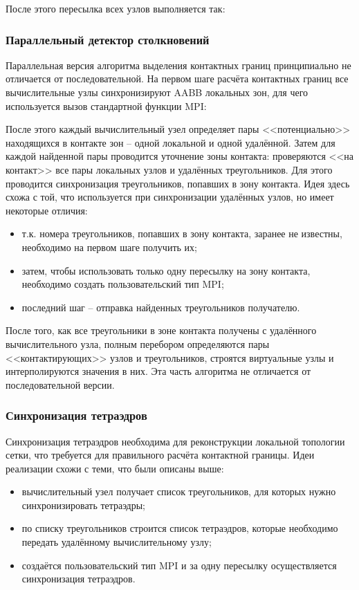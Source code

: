 \clearpage
\newpage

После этого пересылка всех узлов выполняется так:

\subsubsection{Параллельный детектор столкновений}
Параллельная версия алгоритма выделения контактных границ принципиально не отличается от последовательной. На первом шаге расчёта контактных границ все вычислительные узлы синхронизируют AABB локальных зон, для чего используется вызов стандартной функции MPI:

После этого каждый вычислительный узел определяет пары <<потенциально>> находящихся в контакте зон -- одной локальной и одной удалённой. Затем для каждой найденной пары проводится уточнение зоны контакта: проверяются <<на контакт>> все пары локальных узлов и удалённых треугольников. Для этого проводится синхронизация треугольников, попавших в зону контакта. Идея здесь схожа с той, что используется при синхронизации удалённых узлов, но имеет некоторые отличия:
\begin{itemize}
	\item т.к. номера треугольников, попавших в зону контакта, заранее не известны, необходимо на первом шаге получить их;
	\item затем, чтобы использовать только одну пересылку на зону контакта, необходимо создать пользовательский тип MPI;
	\item последний шаг -- отправка найденных треугольников получателю.
\end{itemize}
После того, как все треугольники в зоне контакта получены с удалённого вычислительного узла, полным перебором определяются пары <<контактирующих>> узлов и треугольников, строятся виртуальные узлы и интерполируются значения в них. Эта часть алгоритма не отличается от последовательной версии.
\subsubsection{Синхронизация тетраэдров}
Синхронизация тетраэдров необходима для реконструкции локальной топологии сетки, что требуется для правильного расчёта контактной границы. Идеи реализации схожи с теми, что были описаны выше:
\begin{itemize}
	\item вычислительный узел получает список треугольников, для которых нужно синхронизировать тетраэдры;
	\item по списку треугольников строится список тетраэдров, которые необходимо передать удалённому вычислительному узлу;
	\item создаётся пользовательский тип MPI и за одну пересылку осуществляется синхронизация тетраэдров.
\end{itemize}
